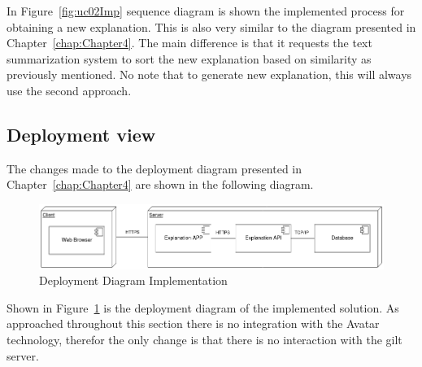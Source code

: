 In Figure~\ref{fig:uc02Imp} sequence diagram is shown the implemented process for obtaining a new explanation.
This is also very similar to the diagram presented in Chapter~\ref{chap:Chapter4}.
The main difference is that it requests the text summarization system to sort the new explanation based on similarity as previously mentioned.
No note that to generate new explanation, this will always use the second approach.

\subsection{Deployment view}

The changes made to the deployment diagram presented in Chapter~\ref{chap:Chapter4} are shown in the following diagram.

\begin{figure}[H]
\centering
\includegraphics[width=\textwidth,keepaspectratio]{ch5/assets/deployment_diagram_Implement.png}
\caption[Deployment Diagram Implementation]{Deployment Diagram Implementation}
\label{fig:deployImp}
\end{figure}

Shown in Figure~\ref{fig:deployImp} is the deployment diagram of the implemented solution.
As approached throughout this section there is no integration with the Avatar technology, therefor the only change is that there is no interaction with the gilt server.
